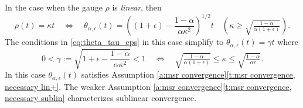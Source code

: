 \documentclass[12pt]{article}
\theoremstyle{definition}
\renewcommand{\equiv}{:=}
\newcommand{\paren}[1]{\left(#1\right)}
\begin{document}
In the case when the gauge $\rho$ is {\em linear}, then
\[
\rho(t)=\kappa t\quad\iff\quad
\theta_{\alpha, \epsilon}(t)=\paren{(1+\epsilon)-\frac{1-\alpha}{\alpha\kappa^2}}^{1/2}t\quad
\paren{\kappa\geq \sqrt{\tfrac{1-\alpha}{\alpha(1+\epsilon)}}}.
\]
The conditions in \eqref{eq:theta_tau_eps} in this
case simplify to $\theta_{\alpha, \epsilon}(t)=\gamma t$ where
\begin{equation}\label{eq:theta linear}
 0< \gamma\equiv \sqrt{1+\epsilon-\frac{1-\alpha}{\alpha\kappa^2}}<1\quad\iff\quad
\sqrt{\tfrac{1-\alpha}{\alpha(1+\epsilon)}}\leq  \kappa\leq \sqrt{\tfrac{1-\alpha}{\alpha\epsilon}}.
\end{equation}
In this case  $\theta_{\alpha, \epsilon}(t)$ satisfies
Assumption \ref{a:msr convergence}\eqref{t:msr convergence, necessary lin+}.
The weaker Assumption \ref{a:msr convergence}\eqref{t:msr convergence, necessary sublin}
characterizes sublinear convergence.
\end{document}
